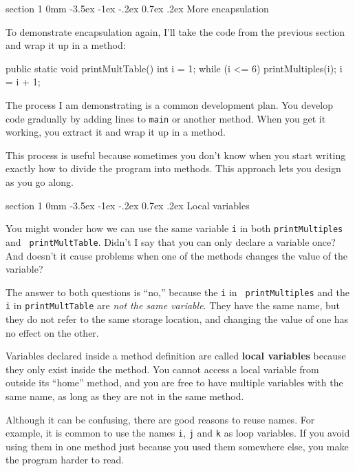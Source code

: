\documentclass{book}
\makeatletter
\renewcommand{\section}{\@startsection 
    {section} {1} {0mm}%
    {-3.5ex \@plus -1ex \@minus -.2ex}%
    {0.7ex \@plus.2ex}%
    {\normalfont\Large\bfseries}}
\makeatother
\begin{document}
\section{More encapsulation}

To demonstrate encapsulation again, I'll take the code
from the previous section and wrap it up in a method:

\begin{verbatimtab}
  public static void printMultTable() {
    int i = 1;
    while (i <= 6) {
      printMultiples(i);
      i = i + 1;
    }
  }
\end{verbatimtab}
%
The process I am demonstrating is a common 
development plan.  You develop code gradually by adding
lines to {\tt main} or another method.  When you get
it working, you extract it and wrap it up in a method.

This process is useful because sometimes you don't know
when you start writing exactly how to divide the program into
methods.  This approach lets you design as you go along.


\section{Local variables}

You might wonder how we can use the same
variable {\tt i} in both {\tt printMultiples} and {\tt
printMultTable}.  Didn't I say that you can only declare a variable
once?  And doesn't it cause problems when one of the methods changes
the value of the variable?

The answer to both questions is ``no,'' because the {\tt i} in {\tt
printMultiples} and the {\tt i} in {\tt printMultTable} are
{\em not the same variable}.  They have the same name, but
they do not refer to the same storage location, and changing
the value of one has no effect on the other.

Variables declared inside a method definition are
called {\bf local variables} because they only exist inside
the method.  You cannot access a local variable from outside
its ``home'' method, and you are free to have multiple
variables with the same name, as long as they are not in
the same method.

Although it can be confusing, there are good
reasons to reuse names.  For example, it is common to
use the names {\tt i}, {\tt j} and {\tt k} as loop variables.
If you avoid using them in one method just because you
used them somewhere else, you make the program
harder to read.
\end{document}
